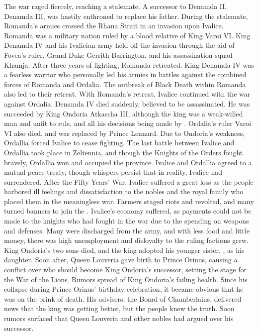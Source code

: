%
The war raged fiercely, reaching a stalemate. 
A successor to Denamda II, Denamda III, was hastily enthroned to replace his father.
During the stalemate, Romanda's armies crossed the Rhana Strait in an invasion upon Ivalice. 
Romanda was a military nation ruled by a blood relative of King Varoi VI. 
King Denamda IV and his Ivalician army held off the invasion through the aid of Fovea’s ruler, Grand Duke Gerrith Barrington, and his assassination squad Khamja.
After three years of fighting, Romanda retreated. 
King Denamda IV was a fearless warrior who personally led his armies in battles against the combined forces of Romanda and Ordalia. 
The outbreak of Black Death within Romanda also led to their retreat.
With Romanda's retreat, Ivalice continued with the war against Ordalia.
Denamda IV died suddenly, believed to be assassinated. 
He was succeeded by King Ondoria Atkascha III, although the king was a weak-willed man and unfit to rule, and all his decisions being made by .
Ordalia's ruler Varoi VI also died, and was replaced by Prince Lennard. 
Due to Ondoria's weakness, Ordallia forced Ivalice to cease fighting.
The last battle between Ivalice and Ordallia took place in Zeltennia, and though the Knights of the Orders fought bravely, Ordallia won and occupied the province. 
Ivalice and Ordallia agreed to a mutual peace treaty, though whispers persist that in reality, Ivalice had surrendered.
After the Fifty Years' War, Ivalice suffered a great loss as the people harbored ill feelings and dissatisfaction to the nobles and the royal family who placed them in the meaningless war. 
Farmers staged riots and revolted, and many turned banners to join the .
Ivalice's economy suffered, as payments could not be made to the knights who had fought in the war due to the spending on weapons and defenses. 
Many were discharged from the army, and with less food and little money, there was high unemployment and disloyalty to the ruling factions grew.
King Ondoria's two sons died, and the king adopted his younger sister, , as his daughter. 
Soon after, Queen Louveria gave birth to Prince Orinus, causing a conflict over who should become King Ondoria's successor, setting the stage for the War of the Lions.
Rumors spread of King Ondoria's failing health. 
Since his collapse during Prince Orinus' birthday celebration, it became obvious that he was on the brink of death. 
His advisers, the Board of Chamberlains, delivered news that the king was getting better, but the people knew the truth. Soon rumors surfaced that Queen Louveria and other nobles had argued over his successor.
